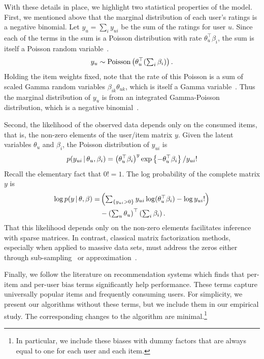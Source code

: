\documentclass{sig-alternate}
\begin{document}
With these details in place, we highlight two statistical properties of the
model. First, we mentioned above that the marginal distribution of
each user's ratings is a negative binomial.  Let $y_{u} = \sum_{i}
y_{ui}$ be the sum of the ratings for user $u$.  Since each of the
terms in the sum is a Poisson distribution with rate $\theta_u^\top
\beta_i$, the sum is itself a Poisson random
variable~\cite{Johnson:2005}.
\begin{equation}
  y_u \sim \textrm{Poisson}\left(\theta_u^\top (\textstyle \sum_{i} \beta_{i})\right).
\end{equation}
Holding the item weights fixed, note that the rate of this Poisson is
a sum of scaled Gamma random variables $\beta_{ik} \theta_{uk}$, which is
itself a Gamma variable~\cite{Norman:1994}.  Thus the marginal
distribution of $y_u$ is from an integrated Gamma-Poisson
distribution, which is a negative binomial~\cite{Gelman:1995}.


Second, the likelihood of the observed data depends only on the
consumed items, that is, the non-zero elements of the user/item matrix
$y$.  Given the latent variables $\theta_u$ and $\beta_i$, the Poisson
distribution of $y_{ui}$ is
\begin{equation}
  p(y_{ui} \,\vert\, \theta_u, \beta_i) =
  \left(\theta_u^\top \beta_i\right)^y
  \exp\left\{-\theta_u^\top \beta_i \right\} / y_{ui}!
\end{equation}
Recall the elementary fact that $0! = 1$.  The log probability of the
complete matrix $y$ is
\begin{align}
  \log p(y \,\vert\, \theta, \beta) =
  & \left(\textstyle \sum_{\{y_{ui} > 0\}}
    y_{ui} \log (\theta_u^\top \beta_i) - \log y_{ui}!
  \right) \\
  & -
  \left(\textstyle\sum_{u} \theta_u\right)^\top \left(\textstyle
    \sum_{i} \beta_i\right).
\end{align}
That this likelihood depends only on the non-zero elements facilitates
inference with sparse matrices.  In contrast, classical matrix
factorization methods, especially when applied to
massive data sets, must address the zeros either through
sub-sampling~\cite{Dror:2012a} or approximation~\cite{Hu:2008p9402}.

Finally, we follow the literature on recommendation systems which
finds that per-item and per-user bias terms significantly help
performance. These terms capture universally popular items and
frequently consuming users.  For simplicity, we present our algorithms
without these terms, but we include them in our empirical study. The
corresponding changes to the algorithm are minimal.\footnote{In
particular, we include these biases with dummy factors that are always
equal to one for each user and each item.}
\end{document}
